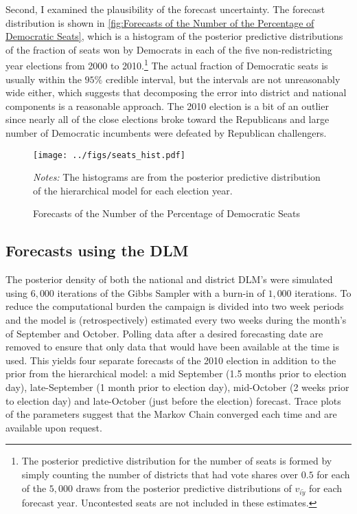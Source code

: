 \documentclass[12pt,final,fleqn]{article}
\theoremstyle{plain}
\begin{document}
Second, I examined the plausibility of the forecast uncertainty. The forecast distribution is shown in \autoref{fig:Forecasts of the Number of the Percentage of Democratic Seats}, which is a histogram of the posterior predictive distributions of the fraction of seats won by Democrats in each of the five non-redistricting year elections from 2000 to 2010.\footnote{ The posterior predictive distribution for the number of seats is formed by simply counting the number of districts that had vote shares over $0.5$ for each of the $5,000$ draws from the posterior predictive distributions of $v_{i\tilde{y}}$ for each forecast year. Uncontested seats are not included in these estimates.} The actual fraction of Democratic seats is usually within the $95\%$ credible interval, but the intervals are not unreasonably wide either, which suggests that decomposing the error into district and national components is a reasonable approach. The 2010 election is a bit of an outlier since nearly all of the close elections broke toward the Republicans and large number of Democratic incumbents were defeated by Republican challengers. 

\begin{figure}[!htb]
\centering
\texttt{[image: ../figs/seats\_hist.pdf]}
\vspace{.5cm}
\caption{Forecasts of the Number of the Percentage of Democratic Seats}
\label{fig:Forecasts of the Number of the Percentage of Democratic Seats}
\begin{minipage}{\linewidth}
\footnotesize
\emph{Notes:} The histograms are from the posterior predictive distribution of the hierarchical model for each election year.
\end{minipage}
\end{figure}

\subsection{Forecasts using the DLM} \label{sec: Results from the DLM}
The posterior density of both the national and district DLM's were simulated using $6,000$ iterations of the Gibbs Sampler with a burn-in of $1,000$ iterations. To reduce the computational burden the campaign is divided into two week periods and the model is (retrospectively) estimated every two weeks during the month's of September and October. Polling data after a desired forecasting date are removed to ensure that only data that would have been available at the time is used. This yields four separate forecasts of the 2010 election in addition to the prior from the hierarchical model: a mid September (1.5 months prior to election day), late-September (1 month prior to election day), mid-October (2 weeks prior to election day) and late-October (just before the election) forecast. Trace plots of the parameters suggest that the Markov Chain converged each time and are available upon request.
\end{document}
